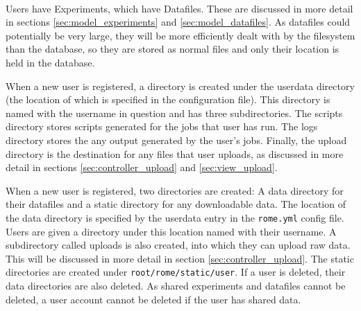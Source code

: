 \paragraph{}
Users have Experiments, which have Datafiles. These are discussed in more detail in sections  \ref{sec:model_experiments} and  \ref{sec:model_datafiles}. As datafiles could potentially be very large, they will be more efficiently dealt with by the filesystem than the database, so they are stored as normal files and only their location is held in the database. 

When a new user is registered, a directory is created under the userdata directory (the location of which is specified in the configuration file). This directory is named with the username in question and has three subdirectories. The scripts directory stores scripts generated for the jobs that user has run. The logs directory stores the any output generated by the user's jobs. Finally, the upload directory is the destination for any files that user uploads, as discussed in more detail in sections \ref{sec:controller_upload} and \ref{sec:view_upload}.

When a new user is registered, two directories are created: A data directory for their datafiles and a static directory for any downloadable data. The location of the data directory is specified by the userdata entry in the \texttt{rome.yml} config file. Users are given a directory under this location named with their username. A subdirectory called uploads is also created, into which they can upload raw data. This will be discussed in more detail in section \ref{sec:controller_upload}. The static directories are created under \texttt{root/rome/static/user}. If a user is deleted, their data directories are also deleted. As shared experiments and datafiles cannot be deleted, a user account cannot be deleted if the user has shared data. 


